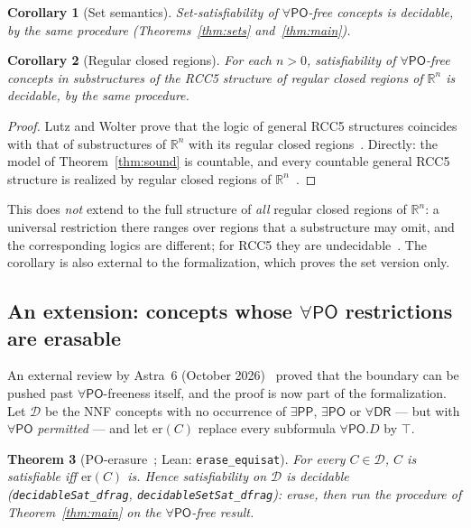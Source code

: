 \documentclass[11pt]{article}
\newcommand{\DR}{\mathsf{DR}}
\newcommand{\PO}{\mathsf{PO}}
\newcommand{\PP}{\mathsf{PP}}
\newcommand{\code}[1]{\texttt{#1}}
\newcommand{\reals}{\mathbb{R}}
\theoremstyle{plain}
\newtheorem{theorem}{Theorem}[section]
\newtheorem{corollary}[theorem]{Corollary}
\theoremstyle{definition}
\begin{document}
\begin{corollary}[Set semantics]
Set-satisfiability of $\forall\PO$-free concepts is decidable, by the same
procedure (Theorems~\ref{thm:sets} and~\ref{thm:main}).
\end{corollary}

\begin{corollary}[Regular closed regions]\label{cor:regions}
For each $n>0$, satisfiability of $\forall\PO$-free concepts in substructures of
the RCC5 structure of regular closed regions of $\reals^n$ is decidable, by the
same procedure.
\end{corollary}

\begin{proof}
Lutz and Wolter prove that the logic of general RCC5 structures coincides with
that of substructures of $\reals^n$ with its regular closed
regions~\cite[Thm.~24]{LutzWolter2006}. Directly: the model of
Theorem~\ref{thm:sound} is countable, and every countable general RCC5 structure
is realized by regular closed regions of $\reals^n$~\cite[Thm.~23]{LutzWolter2006}.
\end{proof}

This does \emph{not} extend to the full structure of \emph{all} regular closed
regions of $\reals^n$: a universal restriction there ranges over regions that a
substructure may omit, and the corresponding logics are different; for RCC5
they are undecidable~\cite[Cor.~26]{LutzWolter2006}. The corollary is also
external to the formalization, which proves the set version only.

\subsection{An extension: concepts whose \texorpdfstring{$\forall\PO$}{forall-PO} restrictions are erasable}
\label{ssec:erasure}

An external review by Astra~6 (October 2026)~\cite{Astra6Review} proved that
the boundary can be pushed past $\forall\PO$-freeness itself, and the proof is
now part of the formalization. Let $\mathcal D$ be the NNF concepts with no
occurrence of $\exists\PP$, $\exists\PO$ or $\forall\DR$ --- but with
$\forall\PO$ \emph{permitted} --- and let $\mathrm{er}(C)$ replace every
subformula $\forall\PO.D$ by $\top$.

\begin{theorem}[PO-erasure~\cite{Astra6Review}; Lean: \code{erase\_equisat}]
\label{thm:erasure}
For every $C\in\mathcal D$, $C$ is satisfiable iff $\mathrm{er}(C)$ is.
Hence satisfiability on $\mathcal D$ is decidable
(\code{decidableSat\_dfrag}, \code{decidableSetSat\_dfrag}): erase, then run
the procedure of Theorem~\ref{thm:main} on the $\forall\PO$-free result.
\end{theorem}
\end{document}
